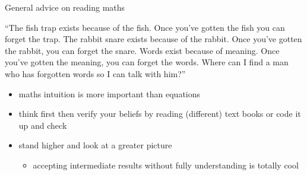 \documentclass[ignorenonframetext,]{beamer}
\providecommand{\tightlist}{%
  \setlength{\itemsep}{0pt}\setlength{\parskip}{0pt}}
\begin{document}
\begin{frame}{General advice on reading maths}
\protect\hypertarget{general-advice-on-reading-maths}{}

\begin{tcolorbox}[colback=red!5!white]
  {\large ``The fish trap exists because of the fish. Once you've gotten the fish you can forget the trap. The rabbit snare exists because of the rabbit. Once you've gotten the rabbit, you can forget the snare. Words exist because of meaning. Once you've gotten the meaning, you can forget the words. Where can I find a man who has forgotten words so I can talk with him?''}
  \hspace*{}
\end{tcolorbox}

\begin{itemize}
\tightlist
\item
  maths intuition is more important than equations
\end{itemize}

\bigskip

\begin{itemize}
\tightlist
\item
  think first then verify your beliefs by reading (different) text books
  or code it up and check
\end{itemize}

\bigskip

\begin{itemize}
\tightlist
\item
  stand higher and look at a greater picture

  \begin{itemize}
  \tightlist
  \item
    accepting intermediate results without fully understanding is
    totally cool
  \end{itemize}
\end{itemize}

\end{frame}
\end{document}
